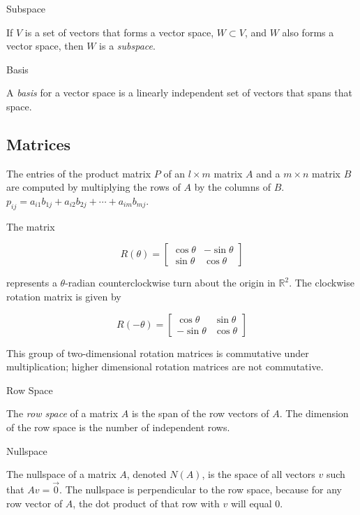 \begin{mybox}{Subspace}

If $V$ is a set of vectors that forms a vector space, $W \subset V$, and $W$ also forms a vector space, then $W$ is a \textit{subspace}.

\end{mybox}

\begin{mybox}{Basis}

A \textit{basis} for a vector space is a linearly independent set of vectors that spans that space.

\end{mybox}

\subsection{Matrices}

The entries of the product matrix $P$ of an $l \times m$ matrix $A$ and a $m \times n$ matrix $B$ are computed by multiplying the rows of $A$ by the columns of $B$. $p_{ij} = a_{i1}b_{1j} + a_{i2}b_{2j} + \cdots + a_{im}b_{mj}$.

The matrix

$$
R(\theta )
=
\begin{bmatrix}
\cos{\theta} & -\sin{\theta} \\
\sin{\theta} &  \cos{\theta}
\end{bmatrix}
$$

represents a $\theta$-radian counterclockwise turn about the origin in $\mathbb{R}^{2}$. The clockwise rotation matrix is given by

$$
R(-\theta )
=
\begin{bmatrix}
	\cos{\theta} & \sin{\theta} \\
-\sin{\theta} & \cos{\theta}
\end{bmatrix}
$$

This group of two-dimensional rotation matrices is commutative under multiplication; higher dimensional rotation matrices are not commutative.

\begin{mybox}{Row Space}

The \textit{row space} of a matrix $A$ is the span of the row vectors of $A$. The dimension of the row space is the number of independent rows.

\end{mybox}

\begin{mybox}{Nullspace}

The nullspace of a matrix $A$, denoted $N(A)$, is the space of all vectors $v$ such that $Av=\vec{0}$. The nullspace is perpendicular to the row space, because for any row vector of $A$, the dot product of that row with $v$ will equal $0$.

\end{mybox}

